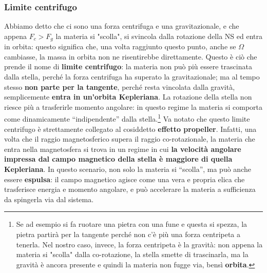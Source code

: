 \subsubsection{Limite centrifugo}
Abbiamo detto che ci sono una forza centrifuga e una gravitazionale, e che appena $F_c > F_g$ la materia si "scolla", si svincola dalla rotazione della NS ed entra in orbita: questo significa che, una volta raggiunto questo punto, anche se $\Omega$ cambiasse, la massa in orbita non ne risentirebbe direttamente.
Questo è ciò che prende il nome di \textbf{limite centrifugo}: la materia non può più essere trascinata dalla stella, perché la forza centrifuga ha superato la gravitazionale; ma al tempo stesso \textbf{non parte per la tangente}, perché resta vincolata dalla gravità, semplicemente \textbf{entra in un'orbita Kepleriana}. La rotazione della stella non riesce più a trasferirle momento angolare: in questo regime la materia si comporta come dinamicamente “indipendente” dalla stella.\footnote{Se ad esempio si fa ruotare una pietra con una fune e questa si spezza, la pietra partirà per la tangente perché non c'è più una forza centripeta a tenerla.
Nel nostro caso, invece, la forza centripeta è la gravità: non appena la materia si "scolla" dalla co-rotazione, la stella smette di trascinarla, ma la gravità è ancora presente e quindi la materia non fugge via, bensì \textbf{orbita}.}
Va notato che questo limite centrifugo è strettamente collegato al cosiddetto \textbf{effetto propeller}. Infatti, una volta che il raggio magnetosferico supera il raggio co-rotazionale, la materia che entra nella magnetosfera si trova in un regime in cui \textbf{la velocità angolare impressa dal campo magnetico della stella è maggiore di quella Kepleriana}. In questo scenario, non solo la materia si “scolla”, ma può anche essere \textbf{espulsa}: il campo magnetico agisce come una vera e propria elica che trasferisce energia e momento angolare, e può accelerare la materia a sufficienza da spingerla via dal sistema.
